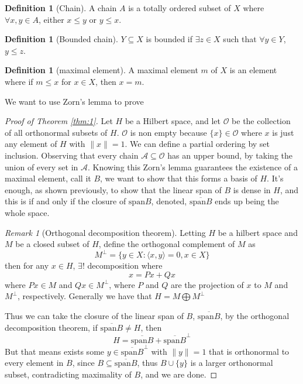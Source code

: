 \documentclass[13pt]{article}
\theoremstyle{definition}
\newtheorem{definition}[theorem]{Definition}
\theoremstyle{remark}
\newtheorem{remark}[theorem]{Remark}
\begin{document}
\begin{definition}[Chain]
    A chain $A$ is a totally ordered subset of $X$ where $\forall x,y \in A$, either $x \leq y$ or $y \leq x$. 
\end{definition}
\begin{definition}[Bounded chain]
   $Y \subseteq X$ is bounded if $\exists z \in X$ such that $\forall y \in Y$, $y \leq z$. 
\end{definition}

\begin{definition}[maximal element]
    A maximal element $m$ of $X$ is an element where if $m \leq x$ for $x \in X$, then $x = m$.
\end{definition}

We want to use Zorn's lemma to prove 
\begin{proof}[Proof of Theorem \ref{thm:1}]
    Let $H$ be a Hilbert space, and let $\mathcal{O}$ be the collection of all orthonormal subsets of $H$. $\mathcal{O}$ is non empty because $\{x\} \in \mathcal{O}$ where $x$ is just any element of $H$ with $\|x\| = 1$. We can define a partial ordering by set inclusion. Observing that every chain $\mathcal{A} \subseteq \mathcal{O}$ has an upper bound, by taking the union of every set in $\mathcal{A}$. Knowing this Zorn's lemma guarantees the existence of a maximal element, call it $B$, we want to show that this forms a basis of $H$. It's enough, as shown previously, to show that the linear span of $B$ is dense in $H$, and this is if and only if the closure of $\text{span}B$, denoted, $\overline{\text{span}B}$ ends up being the whole space. 
    
    \begin{remark}[Orthogonal decomposition theorem]
        Letting $H$ be a hilbert space and $M$ be a closed subset of $H$, define the orthogonal complement of $M$ as 
        $$M^{\perp} = \{ y \in X \colon \langle x,y \rangle = 0, x \in X\}$$ 
        then for any $x \in H$, $\exists! $ decomposition where 
        $$x = Px + Qx$$
        where $Px \in M$ and $Qx \in M^\perp$, where $P$ and $Q$ are the projection of $x$ to $M$ and $M^\perp$, respectively. Generally we have that 
        $H = M \bigoplus M^\perp$
        
    \end{remark}
    Thus we can take the closure of the linear span of $B$, $\overline{\text{span} B}$, by the orthogonal decomposition theorem, if $\overline{\text{span}B} \neq H$, then 
    $$ H = \overline{\text{span}B} + \overline{\text{span}B}^\perp$$
    But that means exists some $y \in \overline{\text{span}B}^\perp$ with $\|y\| = 1$ that is orthonormal to every element in $B$, since $B \subseteq \overline{\text{span}B}$, thus $B \cup \{y\}$ is a larger orthonormal subset, contradicting maximality of $B$, and we are done.
\end{proof}
\end{document}
